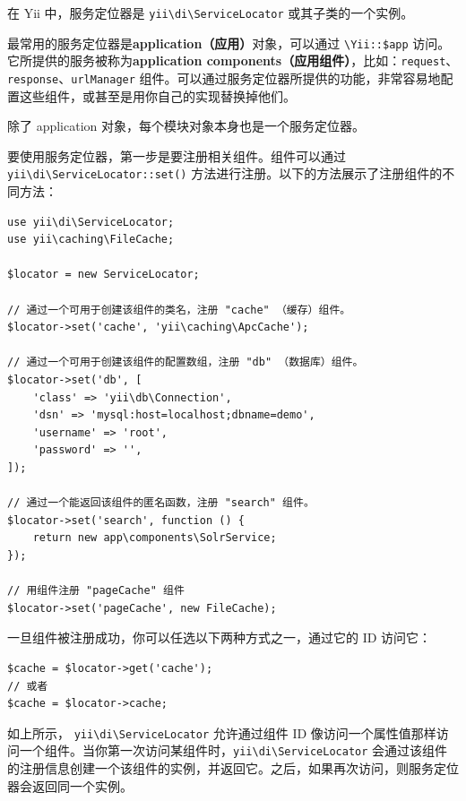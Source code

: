 在 Yii 中，服务定位器是 \texttt{yii{\allowbreak{}\textbackslash}di{\allowbreak{}\textbackslash}ServiceLocator} 或其子类的一个实例。

最常用的服务定位器是\textbf{application（应用）}对象，可以通过 \lstinline|\Yii::$app| 访问。它所提供的服务被称为\textbf{application components（应用组件）}，比如：\lstinline|request|、\lstinline|response|、\lstinline|urlManager| 组件。可以通过服务定位器所提供的功能，非常容易地配置这些组件，或甚至是用你自己的实现替换掉他们。

除了 application 对象，每个模块对象本身也是一个服务定位器。

要使用服务定位器，第一步是要注册相关组件。组件可以通过 \texttt{yii{\allowbreak{}\textbackslash}di{\allowbreak{}\textbackslash}ServiceLocator\allowbreak{}::\allowbreak{}set()} 方法进行注册。以下的方法展示了注册组件的不同方法：

\lstset{language=php}\begin{lstlisting}
use yii\di\ServiceLocator;
use yii\caching\FileCache;

$locator = new ServiceLocator;

// 通过一个可用于创建该组件的类名，注册 "cache" （缓存）组件。
$locator->set('cache', 'yii\caching\ApcCache');

// 通过一个可用于创建该组件的配置数组，注册 "db" （数据库）组件。
$locator->set('db', [
    'class' => 'yii\db\Connection',
    'dsn' => 'mysql:host=localhost;dbname=demo',
    'username' => 'root',
    'password' => '',
]);

// 通过一个能返回该组件的匿名函数，注册 "search" 组件。
$locator->set('search', function () {
    return new app\components\SolrService;
});

// 用组件注册 "pageCache" 组件
$locator->set('pageCache', new FileCache);
\end{lstlisting}
一旦组件被注册成功，你可以任选以下两种方式之一，通过它的 ID 访问它：

\lstset{language=php}\begin{lstlisting}
$cache = $locator->get('cache');
// 或者
$cache = $locator->cache;
\end{lstlisting}
如上所示， \texttt{yii{\allowbreak{}\textbackslash}di{\allowbreak{}\textbackslash}ServiceLocator} 允许通过组件 ID 像访问一个属性值那样访问一个组件。当你第一次访问某组件时，\texttt{yii{\allowbreak{}\textbackslash}di{\allowbreak{}\textbackslash}ServiceLocator} 会通过该组件的注册信息创建一个该组件的实例，并返回它。之后，如果再次访问，则服务定位器会返回同一个实例。


